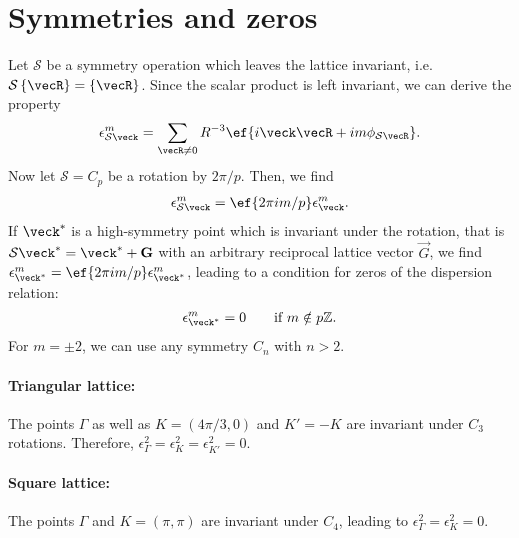 \section{Symmetries and zeros}
\newcommand{\sop}{\mathcal{S}}
Let $\sop$ be a symmetry operation which leaves the lattice invariant, i.e. $\sop \, \{ \vecR \} = \{ \vecR \}$.
Since the scalar product is left invariant,
we can derive the property
\begin{align}
    \eps_{\sop\veck}^m = \sum_{\vecR\ne 0} R^{-3} \ef{i\veck \vecR + i m \phi_{\sop\vecR}}.
\end{align}
Now let $\sop=C_p$ be a rotation by $2\pi/p$. Then, we find
\begin{align}
    \eps_{\sop \veck}^m = \ef{2\pi i m/p} \epskm.
\end{align}
If $\veck^*$ is a high-symmetry point which is invariant under the rotation, that is
$\sop\veck^* = \veck^* + \vec{G}$ with an arbitrary reciprocal lattice vector $\vec{G}$, we find $\eps_{\veck^*}^m = \ef{2\pi i m/p} \eps_{\veck^*}^m$, leading to a condition for zeros of the dispersion relation:
\begin{align}
    \epsilon^m_{\veck^*} = 0\qquad\text{if } m \notin p\mathbb{Z}.
\end{align}
For $m=\pm 2$, we can use any symmetry $C_n$ with $n>2$.


\paragraph{Triangular lattice:} The points $\Gamma$ as well as
$K=(4\pi/3,0)$ and $K'=- K$ are invariant under $C_3$ rotations. Therefore,
$\epsilon^2_\Gamma=\epsilon^2_K=\epsilon^2_{K'}=0$.

\paragraph{Square lattice:} The points $\Gamma$ and $K=(\pi,\pi)$ are
invariant under $C_4$, leading to $\epsilon^2_\Gamma=\epsilon^2_K=0$.


